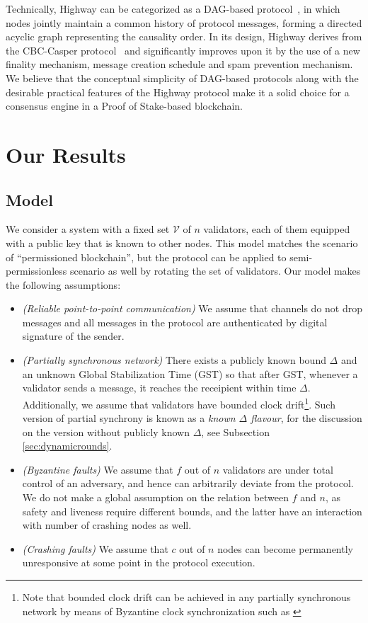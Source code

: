 \documentclass[12pt, fleqn]{article}
\begin{document}
Technically, Highway can be categorized as a DAG-based protocol~\cite{moser1999byzantine,zamfir2018casper,baird2016hashgraph,GLSS19}, in which nodes jointly maintain a common history of protocol messages, forming a directed acyclic graph representing the causality order.
%
In its design, Highway derives from the CBC-Casper protocol~\cite{zamfir2018casper} and significantly improves upon it by the use of a new finality mechanism, message creation schedule and spam prevention mechanism.
%
We believe that the conceptual simplicity of DAG-based protocols along with the desirable practical features of the Highway protocol make it a solid choice for a consensus engine in a Proof of Stake-based blockchain. 




\section{Our Results}

\subsection{Model}

We consider a system with a fixed set $\mathcal{V}$ of $n$ validators, each of them equipped with a public key that is known to other nodes.
This model matches the scenario of ``permissioned blockchain'', but the protocol can be applied to semi-permissionless scenario as well by rotating the set of validators.
Our model makes the following assumptions:
\begin{itemize}
    \item\emph{(Reliable point-to-point communication)}
    We assume that channels do not drop messages and all messages in the protocol are authenticated by digital signature of the sender.
    \item\emph{(Partially synchronous network)} There exists a publicly known bound $\Delta$ and an unknown Global Stabilization Time (GST) so that after GST, whenever a validator sends a message, it reaches the receipient within time $\Delta$. Additionally, we assume that validators have bounded clock drift\footnote{Note that bounded clock drift can be achieved in any partially synchronous network by means of Byzantine clock synchronization such as \cite{DLS88}}. 
    Such version of partial synchrony is known as a \emph{known $\Delta$ flavour}, for the discussion on the version without publicly known $\Delta$, see Subsection \ref{sec:dynamicrounds}.
    \item\emph{(Byzantine faults)} We assume that $f$ out of $n$ validators are under total control of an adversary, and hence can arbitrarily deviate from the protocol. We do not make a global assumption on the relation between $f$ and $n$, as safety and liveness require different bounds, and the latter have an interaction with number of crashing nodes as well.
    \item\emph{(Crashing faults)} We assume that $c$ out of $n$ nodes can become permanently unresponsive at some point in the protocol execution.
\end{itemize}
\end{document}
